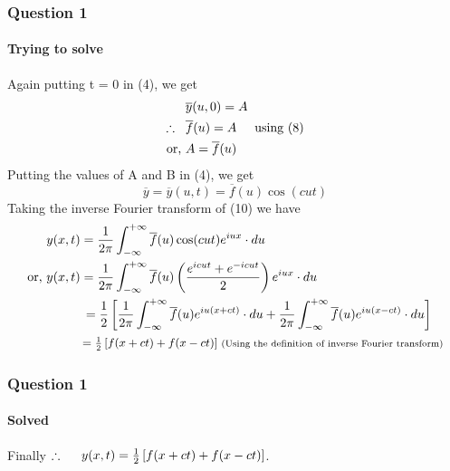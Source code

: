 \documentclass[9 pt]{beamer}
\begin{document}
\begin{frame}[fragile]
	\frametitle{Question 1}
	\framesubtitle{Trying to solve}
	Again putting t = 0 in (4), we get
	\begin{align*}
		                                     & \overline{y}(u,0)=A \\
		\therefore \hspace{0.3cm} & \overline{f}(u)=A \hspace{0.5cm} \textrm{using (8)} \\
		\textrm{or, }                   & A=\overline{f}(u)
	\end{align*}
	Putting the values of A and B in (4), we get
	\begin{equation}
		\overline{y}=\overline{y}(u,t)=\overline{f}(u)\cos (cut)
	\end{equation}
	Taking the inverse Fourier transform of (10) we have
	\begin{align*}
		              & y(x,t)=\frac{1}{2\pi}\int_{-\infty}^{+\infty}\overline{f}(u)\cos (cut)e^{iux}\cdot du \\
		\textrm{or, } & y(x,t)=\frac{1}{2\pi}\int_{-\infty}^{+\infty}\overline{f}(u)\left(\frac{e^{icut}+e^{-icut}}{2}\right) e^{iux}\cdot du \\
		              & \hspace{1cm}=\frac{1}{2}\left[\frac{1}{2\pi}\int_{-\infty}^{+\infty}\overline{f}(u)e^{iu(x+ct)}\cdot du + \frac{1}{2\pi}\int_{-\infty}^{+\infty}\overline{f}(u)e^{iu(x-ct)}\cdot du\right] \\
		              & \hspace{1cm}\mbox{\small $=\frac{1}{2}\left[f(x+ct)+f(x-ct)\right]$}\hspace{0.1cm} \textrm{\scriptsize{(Using the definition of inverse Fourier transform)}}
	\end{align*}
	\transfade[duration=0.6]
\end{frame}


\begin{frame}[fragile]
	\frametitle{Question 1}
	\framesubtitle{Solved}
	\begin{block}{Finally}
		$\therefore\hspace{0.5cm}y(x,t)=\frac{1}{2}\left[f(x+ct)+f(x-ct)\right]$.
	\end{block}
	\transwipe[duration=0.6]
\end{frame}
\end{document}
